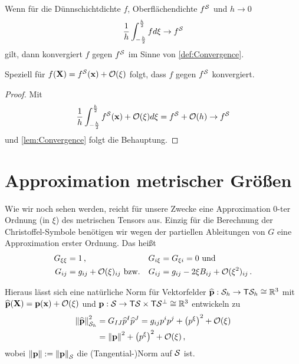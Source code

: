 \documentclass[a4paper,11pt]{scrartcl}
\newcommand{\surfh}{\surf_{h}}
\newcommand{\landau}{\mathcal{O}}
\begin{document}
\begin{lem}\label{lem:Convergence}
  Wenn für die Dünnschichtdichte \( f \), Oberflächendichte \( f^{\mathcal{S}} \) und \( h \rightarrow 0 \)
  \begin{align}
    \frac{1}{h}\int_{-\frac{h}{2}}^{\frac{h}{2}} f d\xi \rightarrow f^{\mathcal{S}}
  \end{align}
  gilt, dann konvergiert \( f \) gegen \( f^{\mathcal{S}} \) im Sinne von \autoref{def:Convergence}.
\end{lem}

\begin{con}\label{con:Convergence}
  Speziell für \( f(\Xb) = f^{\surf}(\xb) + \landau(\xi) \) folgt, dass \( f \) gegen \( f^{\mathcal{S}} \) konvergiert.
\end{con}
\begin{proof}
  Mit
  \begin{align}
    \frac{1}{h}\int_{-\frac{h}{2}}^{\frac{h}{2}} f^{\surf}(\xb) + \landau(\xi) d\xi
        = f^{\surf} + \landau(h) \rightarrow f^{\surf}
  \end{align}
  und \autoref{lem:Convergence} folgt die Behauptung.
\end{proof}

\section{Approximation metrischer Größen}

Wie wir noch sehen werden, reicht für unsere Zwecke eine Approximation 0-ter Ordnung (in \( \xi \)) des metrischen Tensors aus.
Einzig für die Berechnung der Christoffel-Symbole benötigen wir wegen der partiellen Ableitungen von \( G \) eine Approximation erster
Ordnung.
Das heißt
\begin{align}
  G_{\xi\xi} &= 1\formComma & G_{i\xi} &= G_{\xi i} = 0 \text{ und}\\
  G_{ij} &= g_{ij} + \landau(\xi)_{ij} \text{ bzw.} &   G_{ij} &= g_{ij} - 2\xi B_{ij} + \landau(\xi^{2})_{ij} \formPeriod
\end{align}

Hieraus lässt sich eine natürliche Norm für Vektorfelder \( \pExt:\surfh \rightarrow \Tangent\surfh \cong \R^{3} \) mit
\( \pExt(\Xb) = \pb(\xb) + \landau(\xi)   \) und \( \mathbf{p}:\mathcal{S} \rightarrow \mathsf{T}\mathcal{S}\times\mathsf{T}\mathcal{S}^{\bot} \cong \mathbb{R}^{3} \)
entwickeln zu
\begin{align}
  \left\| \pExt \right\|^{2}_{\surfh} &= G_{IJ}\pIExt^{I}\pIExt^{J}
                                       = g_{ij}p^{i}p^{j} + \left( p^{\xi} \right)^{2} + \landau(\xi) \\
                                      &= \left\| \pb \right\|^{2} + \left( p^{\xi} \right)^{2} + \landau(\xi) 
                                            \label{eq:norm}\formComma
\end{align}
wobei \( \left\| \mathbf{p} \right\| := \left\| \mathbf{p} \right\|_{\mathcal{S}} \) die (Tangential-)Norm auf \( \mathcal{S}  \) ist.
\end{document}
